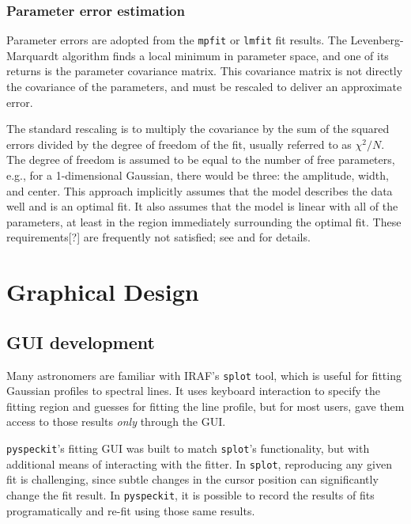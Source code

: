 \documentclass[twocolumn]{aastex61}
\newcommand{\pyspeckit}{\texttt{pyspeckit}\xspace}
\begin{document}
\subsubsection{Parameter error estimation}
\label{sec:parerrest}
Parameter errors are adopted from the \texttt{mpfit} or \texttt{lmfit}
fit results.  The Levenberg-Marquardt algorithm
 finds a local minimum in parameter space,
and one of its returns is the parameter covariance matrix.  This covariance
matrix is not directly the covariance of the parameters, and must be rescaled
to deliver an approximate error.

The standard rescaling is to multiply the covariance by the sum of the squared
errors divided by the degree of freedom of the fit, usually referred to
as $\chi^2/N$.  The degree of freedom is assumed to be equal to the number
of free parameters, e.g., for a 1-dimensional Gaussian, there would be three:
the amplitude, width, and center.  This approach implicitly assumes that the
model describes the data well and is an optimal fit.  It also assumes that
the model is linear with all of the parameters, at least in the region immediately
surrounding the optimal fit.  These requirements[?] are frequently not satisfied;
see \citet{Andrae2010a} and \citet{Andrae2010b} for details.




\section{Graphical Design}
\label{sec:gui}
\subsection{GUI development}
Many astronomers are familiar with IRAF's \texttt{splot} tool, which is useful
for fitting Gaussian profiles to spectral lines.  It uses keyboard interaction
to specify the fitting region and guesses for fitting the line profile, but for
most users, gave them access to those results \emph{only} through the GUI.

\texttt{pyspeckit}'s fitting GUI was built to match \texttt{splot}'s
functionality, but with additional means of interacting with the fitter.  In
\texttt{splot}, reproducing any given fit is challenging, since subtle changes
in the cursor position can significantly change the fit result.  In \pyspeckit,
it is possible to record the results of fits programatically and re-fit using
those same results.
\end{document}

